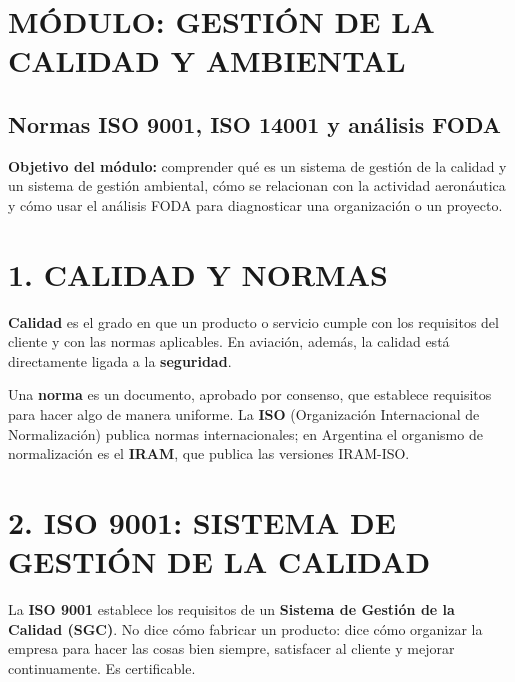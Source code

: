\clearpage
\section*{MÓDULO: GESTIÓN DE LA CALIDAD Y AMBIENTAL}
\subsection*{Normas ISO 9001, ISO 14001 y análisis FODA}

\begin{recuadro}
\textbf{Objetivo del módulo:} comprender qué es un sistema de gestión de la calidad y un
sistema de gestión ambiental, cómo se relacionan con la actividad aeronáutica y cómo usar el
análisis FODA para diagnosticar una organización o un proyecto.
\end{recuadro}

\section*{1. CALIDAD Y NORMAS}

\textbf{Calidad} es el grado en que un producto o servicio cumple con los requisitos del
cliente y con las normas aplicables. En aviación, además, la calidad está directamente
ligada a la \textbf{seguridad}.

Una \textbf{norma} es un documento, aprobado por consenso, que establece requisitos para
hacer algo de manera uniforme. La \textbf{ISO} (Organización Internacional de Normalización)
publica normas internacionales; en Argentina el organismo de normalización es el
\textbf{IRAM}, que publica las versiones IRAM-ISO.

\section*{2. ISO 9001: SISTEMA DE GESTIÓN DE LA CALIDAD}

La \textbf{ISO 9001} establece los requisitos de un \textbf{Sistema de Gestión de la Calidad
(SGC)}. No dice cómo fabricar un producto: dice cómo organizar la empresa para hacer las
cosas bien siempre, satisfacer al cliente y mejorar continuamente. Es certificable.

